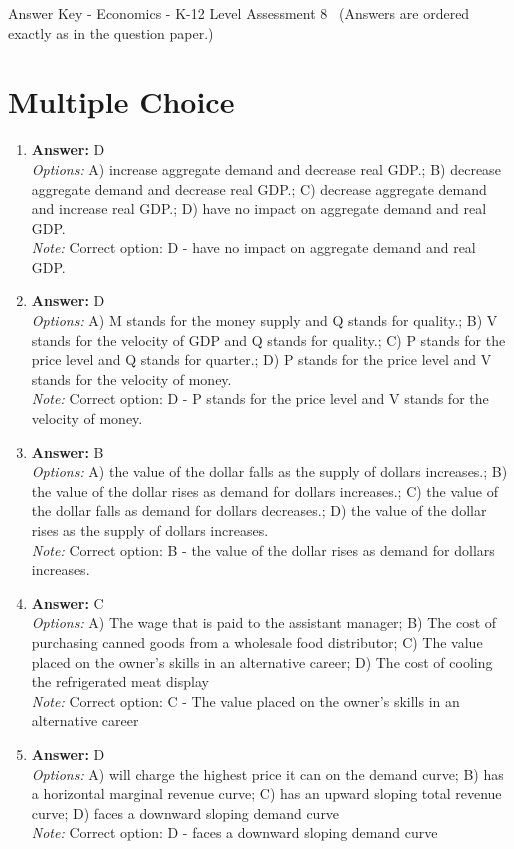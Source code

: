 \documentclass[12pt]{article}
\begin{document}
\begin{center}
Answer Key - Economics - K-12 Level Assessment 8 \
\small (Answers are ordered exactly as in the question paper.)
\end{center}

\section*{Multiple Choice}
\begin{enumerate}[label=\arabic*.]
\item \textbf{Answer:} D
\\ \textit{Options:} A) increase aggregate demand and decrease real GDP.; B) decrease aggregate demand and decrease real GDP.; C) decrease aggregate demand and increase real GDP.; D) have no impact on aggregate demand and real GDP.
\\ \textit{Note:} Correct option: D - have no impact on aggregate demand and real GDP.
\item \textbf{Answer:} D
\\ \textit{Options:} A) M stands for the money supply and Q stands for quality.; B) V stands for the velocity of GDP and Q stands for quality.; C) P stands for the price level and Q stands for quarter.; D) P stands for the price level and V stands for the velocity of money.
\\ \textit{Note:} Correct option: D - P stands for the price level and V stands for the velocity of money.
\item \textbf{Answer:} B
\\ \textit{Options:} A) the value of the dollar falls as the supply of dollars increases.; B) the value of the dollar rises as demand for dollars increases.; C) the value of the dollar falls as demand for dollars decreases.; D) the value of the dollar rises as the supply of dollars increases.
\\ \textit{Note:} Correct option: B - the value of the dollar rises as demand for dollars increases.
\item \textbf{Answer:} C
\\ \textit{Options:} A) The wage that is paid to the assistant manager; B) The cost of purchasing canned goods from a wholesale food distributor; C) The value placed on the owner's skills in an alternative career; D) The cost of cooling the refrigerated meat display
\\ \textit{Note:} Correct option: C - The value placed on the owner's skills in an alternative career
\item \textbf{Answer:} D
\\ \textit{Options:} A) will charge the highest price it can on the demand curve; B) has a horizontal marginal revenue curve; C) has an upward sloping total revenue curve; D) faces a downward sloping demand curve
\\ \textit{Note:} Correct option: D - faces a downward sloping demand curve
\end{enumerate}
\end{document}
